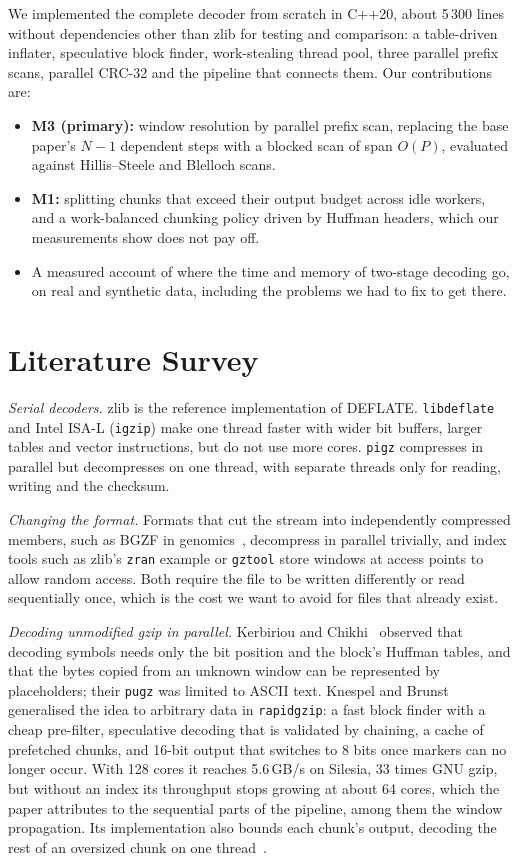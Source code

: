 \documentclass[conference]{IEEEtran}
\begin{document}
We implemented the complete decoder from scratch in C++20, about 5\,300 lines without
dependencies other than zlib for testing and comparison: a table-driven inflater,
speculative block finder, work-stealing thread pool, three parallel prefix scans,
parallel CRC-32 and the pipeline that connects them. Our contributions are:
\begin{itemize}
\item \textbf{M3 (primary):} window resolution by parallel prefix scan, replacing the
base paper's $N-1$ dependent steps with a blocked scan of span $O(P)$, evaluated
against Hillis--Steele and Blelloch scans.
\item \textbf{M1:} splitting chunks that exceed their output budget across idle
workers, and a work-balanced chunking policy driven by Huffman headers, which our
measurements show does not pay off.
\item A measured account of where the time and memory of two-stage decoding go, on
real and synthetic data, including the problems we had to fix to get there.
\end{itemize}

\section{Literature Survey}

\emph{Serial decoders.} zlib is the reference implementation of DEFLATE.
\texttt{libdeflate} and Intel ISA-L (\texttt{igzip}) make one thread faster with
wider bit buffers, larger tables and vector instructions, but do not use more
cores. \texttt{pigz} compresses in parallel but decompresses on one thread, with
separate threads only for reading, writing and the checksum.

\emph{Changing the format.} Formats that cut the stream into independently
compressed members, such as BGZF in genomics~\cite{samtools}, decompress in parallel
trivially, and index tools such as zlib's \texttt{zran} example or \texttt{gztool}
store windows at access points to allow random access. Both require the file to be
written differently or read sequentially once, which is the cost we want to avoid
for files that already exist.

\emph{Decoding unmodified gzip in parallel.} Kerbiriou and Chikhi~\cite{pugz}
observed that decoding symbols needs only the bit position and the block's Huffman
tables, and that the bytes copied from an unknown window can be represented by
placeholders; their \texttt{pugz} was limited to ASCII text. Knespel and
Brunst~\cite{rapidgzip} generalised the idea to arbitrary data in
\texttt{rapidgzip}: a fast block finder with a cheap pre-filter, speculative decoding
that is validated by chaining, a cache of prefetched chunks, and 16-bit output that
switches to 8 bits once markers can no longer occur. With 128 cores it reaches
5.6\,GB/s on Silesia, 33 times GNU gzip, but without an index its throughput stops
growing at about 64 cores, which the paper attributes to the sequential parts of
the pipeline, among them the window propagation. Its implementation also bounds each chunk's output, decoding
the rest of an oversized chunk on one thread~\cite{changelog}.
\end{document}

